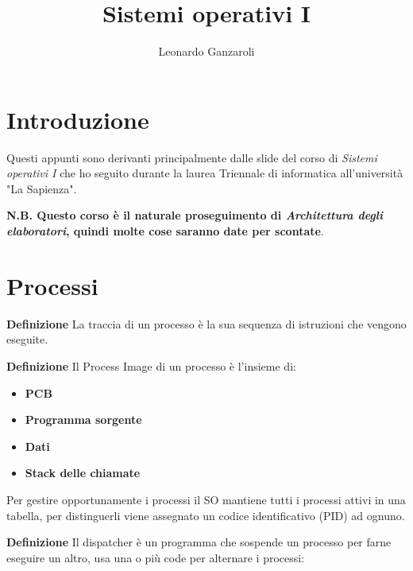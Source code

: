 \documentclass{article}
\title{Sistemi operativi I}
\author{Leonardo Ganzaroli}
\date{}
\begin{document}
\maketitle


\tableofcontents

\hypersetup{allcolors=black}

\newpage

\section*{Introduzione}

Questi appunti sono derivanti principalmente dalle slide del corso di \textit{Sistemi operativi I} che ho seguito durante la laurea Triennale di informatica all'università "La Sapienza".\newline

\noindent \textbf{N.B. Questo corso è il naturale proseguimento di \textit{Architettura degli elaboratori}, quindi molte cose saranno date per scontate}.

\newpage

\section{Processi}

\textbf{Definizione} La traccia di un processo è la sua sequenza di istruzioni che vengono eseguite.\newline

\noindent\textbf{Definizione} Il Process Image di un processo è l'insieme di:
\begin{itemize}
    \item \textbf{PCB}
    \item \textbf{Programma sorgente}
    \item \textbf{Dati}
    \item \textbf{Stack delle chiamate}\newline
\end{itemize}

\noindent Per gestire opportunamente i processi il SO mantiene tutti i processi attivi in una tabella, per distinguerli viene assegnato un codice identificativo (PID) ad ognuno.\newline

\noindent\textbf{Definizione} Il dispatcher è un programma che sospende un processo per farne eseguire un altro, usa una o più code per alternare i processi:\newline
\end{document}
